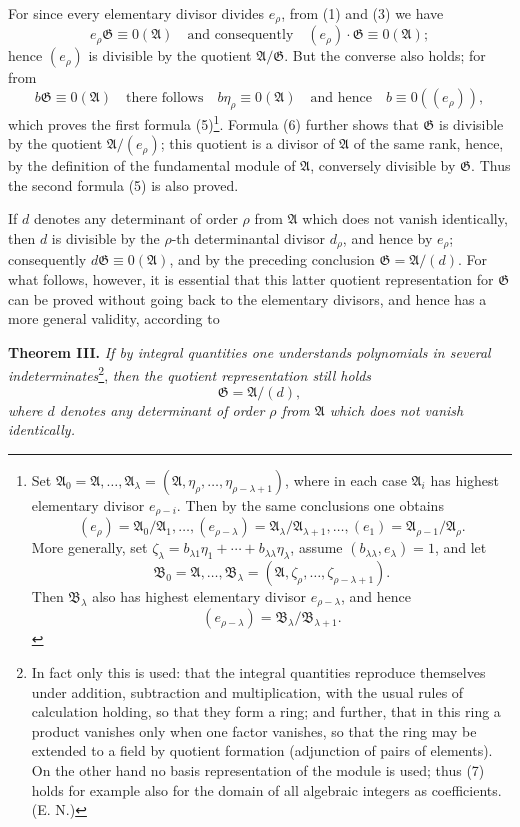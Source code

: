 \documentclass[11pt]{article}
\providecommand{\Amod}{\mathfrak A}
\providecommand{\Bmod}{\mathfrak B}
\providecommand{\Gmod}{\mathfrak G}
\providecommand{\zero}[1]{\equiv 0(#1)}
\providecommand{\Amod}{\mathfrak A}
\providecommand{\Bmod}{\mathfrak B}
\providecommand{\Gmod}{\mathfrak G}
\providecommand{\zero}[1]{\equiv 0\pmod{#1}}
\begin{document}
For since every elementary divisor divides $e_\rho$, from (1) and (3) we have
\begin{equation}
 e_\rho\Gmod\zero{\Amod}\quad \text{and consequently}\quad (e_\rho)\cdot\Gmod\zero{\Amod};
\tag{6}
\end{equation}
hence $(e_\rho)$ is divisible by the quotient $\Amod/\Gmod$. But the converse also holds; for from
\[
 b\Gmod\zero{\Amod}
 \quad\text{there follows}\quad b\eta_\rho\zero{\Amod}
 \quad\text{and hence}\quad b\zero{(e_\rho)},
\]
which proves the first formula (5)\footnote{Set $\Amod_0=\Amod,\ldots,\Amod_\lambda=(\Amod,\eta_\rho,\ldots,\eta_{\rho-\lambda+1})$, where in each case $\Amod_i$ has highest elementary divisor $e_{\rho-i}$. Then by the same conclusions one obtains
\[
 (e_\rho)=\Amod_0/\Amod_1,\ldots,(e_{\rho-\lambda})=\Amod_\lambda/\Amod_{\lambda+1},\ldots,(e_1)=\Amod_{\rho-1}/\Amod_\rho.
\]
More generally, set $\zeta_\lambda=b_{\lambda1}\eta_1+\cdots+b_{\lambda\lambda}\eta_\lambda$, assume $(b_{\lambda\lambda},e_\lambda)=1$, and let
\[
 \Bmod_0=\Amod,\ldots,\Bmod_\lambda=(\Amod,\zeta_\rho,\ldots,\zeta_{\rho-\lambda+1}).
\]
Then $\Bmod_\lambda$ also has highest elementary divisor $e_{\rho-\lambda}$, and hence
\[
 (e_{\rho-\lambda})=\Bmod_\lambda/\Bmod_{\lambda+1}.
\]}. Formula (6) further shows that $\Gmod$ is divisible by the quotient $\Amod/(e_\rho)$; this quotient is a divisor of $\Amod$ of the same rank, hence, by the definition of the fundamental module of $\Amod$, conversely divisible by $\Gmod$. Thus the second formula (5) is also proved.

If $d$ denotes any determinant of order $\rho$ from $\Amod$ which does not vanish identically, then $d$ is divisible by the $\rho$-th determinantal divisor $d_\rho$, and hence by $e_\rho$; consequently $d\Gmod\zero{\Amod}$, and by the preceding conclusion $\Gmod=\Amod/(d)$. For what follows, however, it is essential that this latter quotient representation for $\Gmod$ can be proved without going back to the elementary divisors, and hence has a more general validity, according to

\medskip
\noindent\textbf{Theorem III.} \emph{If by integral quantities one understands polynomials in several indeterminates}\footnote{In fact only this is used: that the integral quantities reproduce themselves under addition, subtraction and multiplication, with the usual rules of calculation holding, so that they form a ring; and further, that in this ring a product vanishes only when one factor vanishes, so that the ring may be extended to a field by quotient formation (adjunction of pairs of elements). On the other hand no basis representation of the module is used; thus (7) holds for example also for the domain of all algebraic integers as coefficients. (E. N.)}, \emph{then the quotient representation still holds}
\begin{equation}
 \Gmod=\Amod/(d),
\tag{7}
\end{equation}
\emph{where $d$ denotes any determinant of order $\rho$ from $\Amod$ which does not vanish identically.}
\end{document}
